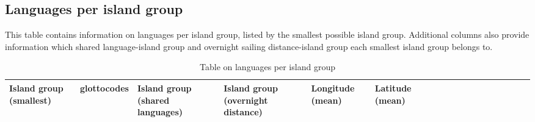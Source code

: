 \documentclass[a4paper,10pt]{article} %
\begin{document}
\subsection{Languages per island group}
\label{Subregions}
\singlespacing

This table contains information on languages per island group, listed by the smallest possible island group. Additional columns also provide information which shared language-island group and overnight sailing distance-island group each smallest island group belongs to.

\begin{landscape}
\begin{longtable}{| p{2.5cm} |  p{7cm} | p{2.5cm}  | p{2.5cm}  | p{2.5cm}  | p{2.5cm}  | p{2.5cm}  | p{2cm}  | p{1cm} | p{1cm}  | p{1cm} | p{1cm}  | p{1.5cm}  | p{1cm} | p{1cm}  | p{1cm}  |p{1cm}  | p{1cm}    |}

\caption{{Table on languages per island group}} 
\label{Subregions_table} \\
\hline
\textbf{Island group (smallest)}& \textbf{glottocodes}& \textbf{Island group (shared languages)}& \textbf{Island group (overnight distance)}& \textbf{Longitude (mean)}& \textbf{Latitude (mean)} \\ \hline
\endfirsthead


\end{longtable}
\end{landscape}
\end{document}
